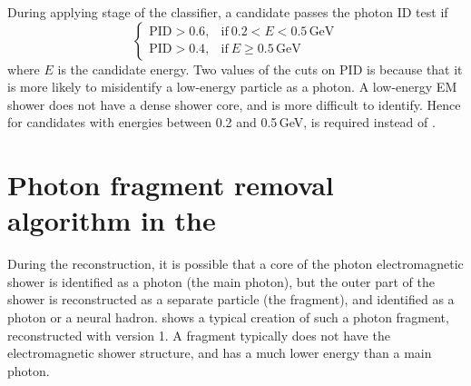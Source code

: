 During applying stage of the classifier, a candidate passes the photon ID test if
\begin{equation}
\begin{cases}
  \text{PID} > 0.6, & \text{if}\ 0.2 < E < 0.5\,\text{GeV}\\
  \text{PID} > 0.4, & \text{if}\ E \geqslant 0.5\,\text{GeV}
\end{cases}
\end{equation}
where $E$ is the candidate energy. Two values of the cuts on $\text{PID}$ is because that it is more likely to misidentify a low-energy particle as a photon. A low-energy EM shower does not have a dense shower core, and is more difficult to identify. Hence for candidates with energies between 0.2 and 0.5\,GeV,  is required instead of .





\section{Photon fragment removal algorithm in the \ECAL}
\label{sec:photonFragRemoval}
During the reconstruction, it is possible that a core of the photon electromagnetic shower is identified as a photon (the main photon), but the outer part of the shower is reconstructed as a separate particle (the fragment), and identified as a photon or a neural hadron.  shows a typical creation of such a photon fragment, reconstructed with \pandora version 1. A fragment typically does not have the electromagnetic shower structure, and has a much lower energy than a main photon.


